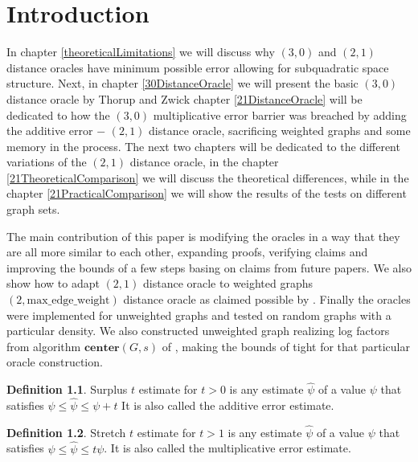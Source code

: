 \documentclass[shortabstract, lic, english]{iithesis}
\author         {Artur Błaszkiewicz}
\theoremstyle{definition} \newtheorem{definition}{Definition}[chapter]
\theoremstyle{remark} \newtheorem{remark}[definition]{Observation}
\theoremstyle{plain} \newtheorem{theorem}[definition]{Theorem}
\theoremstyle{plain} \newtheorem{lemma}[definition]{Lemma}
\theoremstyle{plain} \newtheorem{conjecture}[definition]{Conjecture}
\begin{document}

\chapter{Introduction}

In chapter \ref{theoreticalLimitations} we will discuss why $(3,0)$ and $(2,1)$ distance oracles
have minimum possible error allowing for subquadratic space structure.
Next, in chapter \ref{30DistanceOracle} we will present the basic $(3,0)$ distance oracle by Thorup and Zwick \cite{a0OraclesBasic}
chapter \ref{21DistanceOracle} will be dedicated to how the $(3,0)$ multiplicative error barrier was breached by adding the additive error $-$
$(2,1)$ distance oracle, sacrificing weighted graphs and some memory in the process.
The next two chapters will be dedicated to the different variations of the $(2,1)$ distance oracle,
in the chapter \ref{21TheoreticalComparison} we will discuss the theoretical differences,
while in the chapter \ref{21PracticalComparison} we will show the results of the tests on different graph sets.

The main contribution of this paper is modifying the oracles \cite{a0OraclesBasic} \cite{21OracleBasic} \cite{21OracleLessMemory} in a way that they are all more similar to each other,
expanding proofs, verifying claims and improving the bounds of a few steps basing on claims from future papers.
We also show how to adapt $(2,1)$ distance oracle to weighted graphs $(2,\text{max\_edge\_weight})$ distance oracle as claimed possible by \cite{21OracleSpannerNoPenalty}.
Finally the oracles were implemented for unweighted graphs and tested on random graphs with a particular density. We also constructed unweighted graph realizing log factors from algorithm $\mathbf{center}(G, s)$ of \cite{samplingTechnique},
making the bounds of \cite{21OracleBasic} tight for that particular oracle construction.

\begin{definition}
    Surplus $t$ estimate for $t>0$ is any estimate $\hat{\psi}$ of a value $\psi$ that satisfies $\psi \leq \hat{\psi} \leq \psi + t$
    It is also called the additive error estimate.
\end{definition}

\begin{definition}
    Stretch $t$ estimate for $t>1$ is any estimate $\hat{\psi}$ of a value $\psi$ that satisfies $\psi \leq \hat{\psi} \leq t\psi$.
    It is also called the multiplicative error estimate.
\end{definition}
\end{document}
